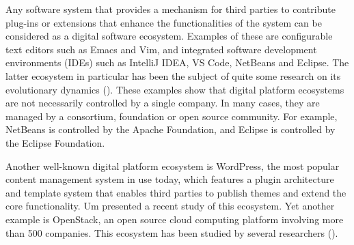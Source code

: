 Any software system that provides a mechanism for third parties to contribute plug-ins or extensions that enhance the functionalities of the system can be considered as a digital software ecosystem. Examples of these are configurable text editors such as Emacs and Vim, and integrated software development environments (IDEs) such as IntelliJ IDEA, VS Code, NetBeans and Eclipse.
The latter ecosystem in particular has been the subject of quite some research on its evolutionary dynamics (\eg \cite{MensRamil2008-ICSM,Businge:SQJ:2015,Businge2012Survival,Businge2013CSMR,Businge:Eclise:saner:2019,Kawuma:ICPC:2016,2-236, AbouKhalil2021, Nugroho2021}).
These examples show that digital platform ecosystems are not necessarily controlled by a single company.
In many cases, they are managed by a consortium, foundation or open source community.
For example, NetBeans is controlled by the Apache Foundation, and Eclipse is controlled by the Eclipse Foundation.

Another well-known digital platform ecosystem is WordPress, the most popular content management system in use today, which features a plugin architecture and template system that enables third parties to publish themes and extend the core functionality.
Um \etal \cite{Um2022WordPress} presented a recent study of this ecosystem.
Yet another example is OpenStack, an open source cloud computing platform involving more than 500 companies.
This ecosystem has been studied by several researchers (\eg \cite{2-236,Teixeira2017,Foundjem:2022wx,Zhang2022}).


